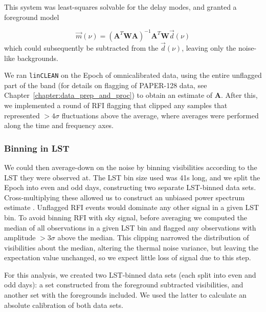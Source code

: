 This system was least-squares solvable for the delay modes, and granted a foreground model

\begin{equation}
\vec{m}(\nu) = (\textbf{A}^T \textbf{W} \textbf{A})^{-1}\textbf{A}^T\textbf{W}\vec{d}(\nu)
\end{equation}
which could subsequently be subtracted from the $\vec{d}(\nu)$, leaving only the noise-like backgrounds.

We ran {\tt linCLEAN} on the Epoch of {\sc omnical}ibrated data, using the entire unflagged part of the band (for details on flagging of PAPER-128 data, see Chapter~\ref{chapter:data_prep_and_proc}) to obtain an estimate of $\textbf{A}$.
After this, we implemented a round of RFI flagging that clipped any samples that represented $>4\sigma$ fluctuations above the average, where averages were performed along the time and frequency axes.

\subsubsection{Binning in LST}

We could then average-down on the noise by binning visibilities according to the LST they were observed at. The LST bin size used was 41s long, and we split the Epoch into even and odd days, constructing two separate LST-binned data sets. Cross-multiplying these allowed us to construct an unbiased power spectrum estimate \citep[e.g.][{\color{red}; Cheng et al. 2018}]{Parsons.14}.
Unflagged RFI events would dominate any other signal in a given LST bin. To avoid binning RFI with sky signal, before averaging we computed the median of all observations in a given LST bin and flagged any observations with amplitude $>3\sigma$ above the median. This clipping narrowed the distribution of visibilities about the median, altering the thermal noise variance, but leaving the expectation value unchanged, so we expect little loss of signal due to this step.

For this analysis, we created two LST-binned data sets (each split into even and odd days): a set constructed from the foreground subtracted visibilities, and another set with the foregrounds included. We used the latter to calculate an absolute calibration of both data sets.

